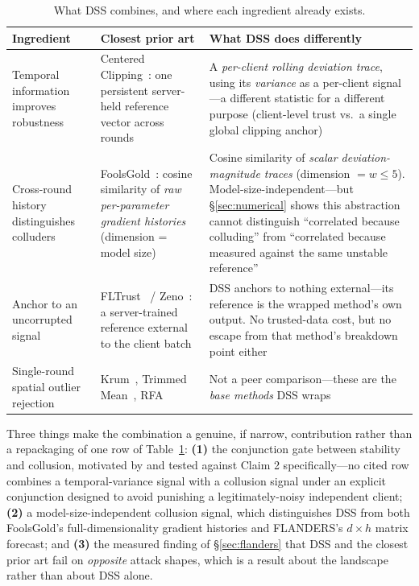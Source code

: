 \documentclass[11pt,a4paper]{article}
\begin{document}
\begin{table}[htbp]
\centering
\small
\caption{What DSS combines, and where each ingredient already exists.}
\label{tab:novelty}
\begin{tabular}{p{} p{} p{}}
\toprule
\textbf{Ingredient} & \textbf{Closest prior art} & \textbf{What DSS does differently} \\
\midrule
Temporal information improves robustness &
Centered Clipping~\cite{karimireddy2021}: one persistent server-held
reference vector across rounds &
A \emph{per-client rolling deviation trace}, using its \emph{variance} as
a per-client signal---a different statistic for a different purpose
(client-level trust vs.\ a single global clipping anchor) \\
\addlinespace
Cross-round history distinguishes colluders &
FoolsGold~\cite{fung2020}: cosine similarity of \emph{raw per-parameter
gradient histories} (dimension = model size) &
Cosine similarity of \emph{scalar deviation-magnitude traces} (dimension
$= w \leq 5$). Model-size-independent---but \S\ref{sec:numerical} shows
this abstraction cannot distinguish ``correlated because colluding'' from
``correlated because measured against the same unstable reference'' \\
\addlinespace
Anchor to an uncorrupted signal &
FLTrust~\cite{cao2021} / Zeno~\cite{xie2019}: a server-trained reference
external to the client batch &
DSS anchors to nothing external---its reference is the wrapped method's
own output. No trusted-data cost, but no escape from that method's
breakdown point either \\
\addlinespace
Single-round spatial outlier rejection &
Krum~\cite{blanchard2017}, Trimmed Mean~\cite{yin2018}, RFA~\cite{pillutla2019} &
Not a peer comparison---these are the \emph{base methods} DSS wraps \\
\bottomrule
\end{tabular}
\end{table}

Three things make the combination a genuine, if narrow, contribution
rather than a repackaging of one row of Table~\ref{tab:novelty}:
\textbf{(1)} the conjunction gate between stability and collusion,
motivated by and tested against Claim 2 specifically---no cited row
combines a temporal-variance signal with a collusion signal under an
explicit conjunction designed to avoid punishing a legitimately-noisy
independent client; \textbf{(2)} a model-size-independent collusion
signal, which distinguishes DSS from both FoolsGold's
full-dimensionality gradient histories and FLANDERS's $d \times h$
matrix forecast; and \textbf{(3)} the measured finding of
\S\ref{sec:flanders} that DSS and the closest prior art fail on
\emph{opposite} attack shapes, which is a result about the landscape
rather than about DSS alone.
\end{document}
